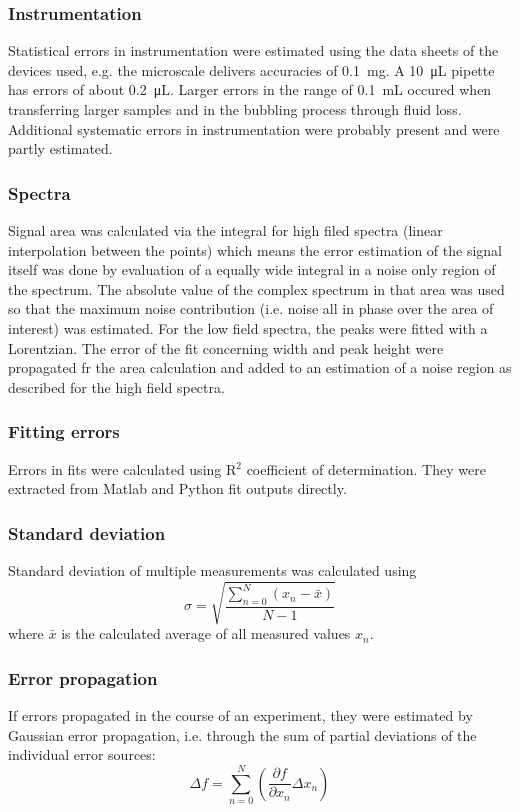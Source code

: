         \subsubsection{Instrumentation}
            Statistical errors in instrumentation were estimated using the data sheets of the devices used, e.g. the microscale delivers accuracies of \SI{0.1}{\milli\gram}. A \SI{10}{\micro\liter} pipette has errors of about \SI{0.2}{\micro\liter}. Larger errors in the range of \SI{0.1}{\milli\liter} occured when transferring larger samples and in the bubbling process through fluid loss. Additional systematic errors in instrumentation were probably present and were partly estimated.
        \subsubsection{Spectra}
            Signal area was calculated via the integral for high filed spectra (linear interpolation between the points) which means the error estimation of the signal itself was done by evaluation of a equally wide integral in a noise only region of the spectrum. The absolute value of the complex spectrum in that area was used so that the maximum noise contribution (i.e. noise all in phase over the area of interest) was estimated.
            For the low field spectra, the peaks were fitted with a Lorentzian. The error of the fit concerning width and peak height were propagated fr the area calculation and added to an estimation of a noise region as described for the high field spectra.
        \subsubsection{Fitting errors}
        Errors in fits were calculated using R$^2$ coefficient of determination. They were extracted from Matlab and Python fit outputs directly.
        \subsubsection{Standard deviation}
            Standard deviation of multiple measurements was calculated using
            \begin{equation}
                \sigma=\sqrt{\frac{\sum_{n=0}^N( x_n - \bar x)}{N-1}}
            \end{equation}
            where $\bar x$ is the calculated average of all measured values $x_n$.
        \subsubsection{Error propagation}
           If errors propagated in the course of an experiment, they were estimated by Gaussian error propagation, i.e. through the sum of partial deviations of the individual error sources:
           \begin{equation}
               \Delta f = \sum_{n=0}^{N}(\frac{\partial f}{\partial x_n} \Delta x_n)
           \end{equation}

